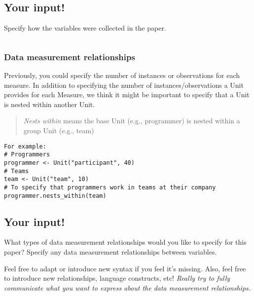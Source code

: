 \hypertarget{your-input}{%
\subsection*{Your input!}\label{your-input}}

Specify how the variables were collected in the paper.

\begin{verbatim}
\end{verbatim}

\hypertarget{data-measurement-relationships}{%
\subsubsection{Data measurement
relationships}\label{data-measurement-relationships}}

Previously, you could specify the number of instances or observations
for each measure. In addition to specifying the number of
instances/observations a Unit provides for each Measure, we think it
might be important to specify that a Unit is nested within another Unit.

\begin{quote}
\emph{Nests within} means the base Unit (e.g., programmer) is nested
within a group Unit (e.g., team)
\end{quote}

\begin{verbatim}
For example:
# Programmers
programmer <- Unit("participant", 40)
# Teams
team <- Unit("team", 10)
# To specify that programmers work in teams at their company
programmer.nests_within(team)
\end{verbatim}

\hypertarget{your-input-1}{%
\subsection*{Your input!}\label{your-input-1}}

What types of data measurement relationships would you like to specify
for this paper? Specify any data measurement relationships between
variables.

Feel free to adapt or introduce new syntax if you feel it's missing.
Also, feel free to introduce new relationships, language constructs,
etc! \emph{Really try to fully communicate what you want to express
about the data measurement relationships.}

\begin{verbatim}
\end{verbatim}
\clearpage



